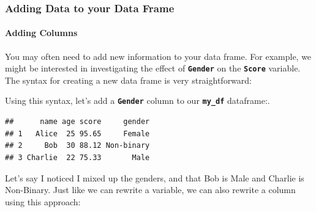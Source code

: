 \documentclass[
]{book}
\newenvironment{Shaded}{\begin{snugshade}}{\end{snugshade}}
\newcommand{\CommentTok}[1]{\textcolor[rgb]{0.56,0.35,0.01}{\textit{#1}}}
\newcommand{\FunctionTok}[1]{\textcolor[rgb]{0.13,0.29,0.53}{\textbf{#1}}}
\newcommand{\NormalTok}[1]{#1}
\newcommand{\OtherTok}[1]{\textcolor[rgb]{0.56,0.35,0.01}{#1}}
\newcommand{\SpecialCharTok}[1]{\textcolor[rgb]{0.81,0.36,0.00}{\textbf{#1}}}
\newcommand{\StringTok}[1]{\textcolor[rgb]{0.31,0.60,0.02}{#1}}
\begin{document}
\subsubsection{Adding Data to your Data Frame}\label{adding-data-to-your-data-frame}

\paragraph{Adding Columns}\label{adding-columns}

You may often need to add new information to your data frame. For example, we might be interested in investigating the effect of \textbf{\texttt{Gender}} on the \textbf{\texttt{Score}} variable. The syntax for creating a new data frame is very straightforward:

\begin{Shaded}
\end{Shaded}

Using this syntax, let's add a \textbf{\texttt{Gender}} column to our \textbf{\texttt{my\_df}} dataframe:.

\begin{Shaded}
\end{Shaded}

\begin{verbatim}
##      name age score     gender
## 1   Alice  25 95.65     Female
## 2     Bob  30 88.12 Non-binary
## 3 Charlie  22 75.33       Male
\end{verbatim}

Let's say I noticed I mixed up the genders, and that Bob is Male and Charlie is Non-Binary. Just like we can rewrite a variable, we can also rewrite a column using this approach:

\begin{Shaded}
\end{Shaded}
\end{document}
